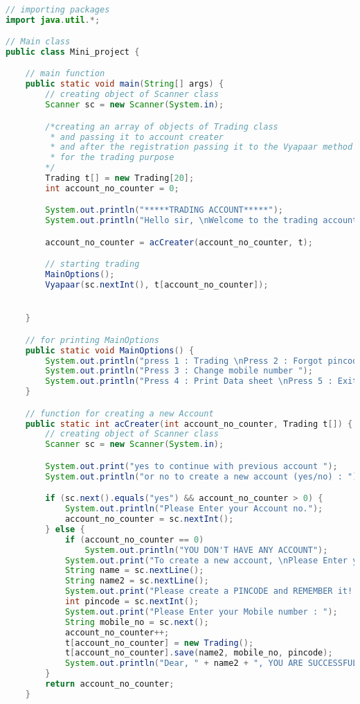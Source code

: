 \documentclass[]{article}
\begin{document}
\scriptsize\begin{lstlisting}[language=java, caption= Java Mini Project ]

// importing packages
import java.util.*;

// Main class
public class Mini_project {

    // main function 
    public static void main(String[] args) {
        // creating object of Scanner class
        Scanner sc = new Scanner(System.in);

        /*creating an array of objects of Trading class
         * and passing it to account creater
         * and after the registration passing it to the Vyapaar method
         * for the trading purpose
        */
        Trading t[] = new Trading[20];
        int account_no_counter = 0;

        System.out.println("*****TRADING ACCOUNT*****");
        System.out.println("Hello sir, \nWelcome to the trading account");

        account_no_counter = acCreater(account_no_counter, t);

        // starting trading 
        MainOptions();
        Vyapaar(sc.nextInt(), t[account_no_counter]);


    }

    // for printing MainOptions
    public static void MainOptions() {
        System.out.println("press 1 : Trading \nPress 2 : Forgot pincode ");
        System.out.println("Press 3 : Change mobile number ");
        System.out.println("Press 4 : Print Data sheet \nPress 5 : Exit");
    }

    // function for creating a new Account 
    public static int acCreater(int account_no_counter, Trading t[]) {
        // creating object of Scanner class
        Scanner sc = new Scanner(System.in);

        System.out.print("yes to continue with previous account ");
        System.out.println("or no to create a new account (yes/no) : ");

        if (sc.next().equals("yes") && account_no_counter > 0) {
            System.out.println("Please Enter your Account no.");
            account_no_counter = sc.nextInt();
        } else {
            if (account_no_counter == 0)
                System.out.println("YOU DON'T HAVE ANY ACCOUNT");
            System.out.print("To create a new account, \nPlease Enter your Full Name : ");
            String name = sc.nextLine();
            String name2 = sc.nextLine();
            System.out.print("Please create a PINCODE and REMEMBER it! : ");
            int pincode = sc.nextInt();
            System.out.print("Please Enter your Mobile number : ");
            String mobile_no = sc.next();
            account_no_counter++;
            t[account_no_counter] = new Trading();
            t[account_no_counter].save(name2, mobile_no, pincode);
            System.out.println("Dear, " + name2 + ", YOU ARE SUCCESSFULLY LOGGED IN !");
        }
        return account_no_counter;
    }


\end{lstlisting}
\end{document}
